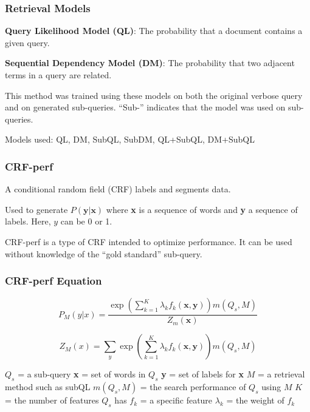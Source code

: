 \documentclass{beamer}
\begin{document}
\begin{frame}[fragile]\frametitle{Retrieval Models}
\textbf{Query Likelihood Model (QL)}: The probability that a document contains
a given query. \vspace*{.5cm}

\textbf{Sequential Dependency Model (DM)}: The probability that two adjacent
terms in a query are related. \vspace*{1cm}

This method was trained using these models on both the original verbose query and
on generated sub-queries. ``Sub-'' indicates that the model was used on sub-queries.

Models used: QL, DM, SubQL, SubDM, QL+SubQL, DM+SubQL
\end{frame}

\begin{frame}[fragile]\frametitle{CRF-perf}
A conditional random field (CRF) labels and segments data. \pause

Used to generate $P(\textbf{y} | \textbf{x})$ where \textbf{x} is a sequence of words
and \textbf{y} a sequence of labels. Here, $y$ can be 0 or 1.\pause

CRF-perf is a type of CRF intended to optimize performance. It can be used without
knowledge of the ``gold standard'' sub-query.
\end{frame}

\begin{frame}[fragile]\frametitle{CRF-perf Equation}
\begin{equation*}
P_M(y|x) = \frac{\exp(\sum_{k=1}^{K}\lambda_kf_k(\mathbf{x},
\mathbf{y}))m(Q_{s},M)}{Z_m(\mathbf{x})}
\end{equation*}

\begin{equation*}
Z_M(x) = \sum_{y}\exp(\sum_{k=1}^{K}\lambda_kf_k(\mathbf{x},\mathbf{y}))m(Q_{s},M)
\end{equation*}

$Q_s$ = a sub-query
\linebreak \textbf{x} = set of words in $Q_s$
\linebreak \textbf{y} = set of labels for \textbf{x}
\linebreak$M$ = a retrieval method such as subQL
\linebreak$m(Q_s, M)$ = the search performance of $Q_s$ using $M$
\linebreak$K$ = the number of features $Q_s$ has
\linebreak$f_k$ = a specific feature 
\linebreak$\lambda_k$ = the weight of $f_k$
\end{frame}
\end{document}
